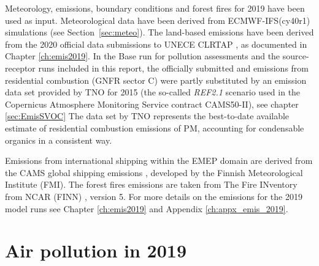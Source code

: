  Meteorology, emissions, boundary conditions and forest fires for 2019 have been
 used as input. Meteorological data have been
 derived from ECMWF-IFS(cy40r1) simulations (see Section~\ref{sec:meteo}). The
 land-based emissions have been derived from the 2020 official data
 submissions to UNECE CLRTAP \citep{CEIP2020}, as documented in
 Chapter \ref{ch:emis2019}. In the Base run for pollution assessments and the source-receptor runs included in this report, the officially submitted \PM[10] and \PM[2.5] emissions from residential combustion (GNFR sector C) were partly substituted by an emission data set provided by TNO for 2015 (the so-called \textit{REF2.1} scenario used in the Copernicus Atmosphere Monitoring Service contract CAMS50-II), see chapter \ref{sec:EmisSVOC} The data set by TNO represents the best-to-date available estimate of residential combustion emissions of PM, accounting for condensable organics in a consistent way. 
 
 Emissions from international shipping
 within the EMEP domain are derived from the CAMS global shipping
 emissions \citep{CAMSemis2019}, developed by the Finnish
 Meteorological Institute (FMI). The forest fires emissions are taken from
 The Fire INventory from NCAR (FINN) \citep{FINNIGAN1990}, version 5.
 For more details on the emissions for the 2019 model runs see Chapter
 \ref{ch:emis2019} and Appendix \ref{ch:appx_emis_2019}.





\section{Air pollution in 2019} 

